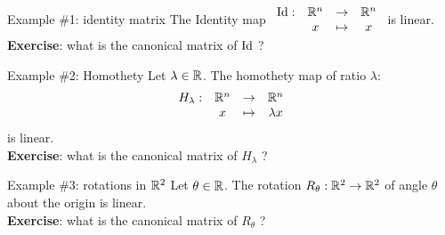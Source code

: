 \documentclass{beamer}
\begin{document}
\begin{frame}[t]{Example \#1: identity matrix}
		The Identity map \quad $\displaystyle
			\begin{array}{cccc}
				{{\rm Id}}: & \mathbb{R}^n & \to & \mathbb{R}^n \\
				   & x & \mapsto & x
			\end{array}
			$
			\quad is linear.
			\\
			\vspace{0.3cm}
			\textbf{Exercise}: what is the canonical matrix of ${{\rm Id}}$ ?
\end{frame}
\begin{frame}[t]{Example \#2: Homothety}
	Let $\lambda \in \mathbb{R}$.
		The homothety map of ratio $\lambda$: 
		 \vspace{-0.2cm}
		 $$
			\begin{array}{cccc}
				H_{\lambda}: & \R^n & \to & \R^n \\
				   & x & \mapsto & \lambda x
			\end{array}
			\vspace{-0.5cm}
			$$
			is linear.
			\\
			\vspace{0.3cm}
			\textbf{Exercise}: what is the canonical matrix of $H_{\lambda}$ ?
\end{frame}
\begin{frame}[t]{Example \#3: rotations in $\mathbb{R}^2$}
	Let $\theta \in \mathbb{R}$.
	The rotation $R_{\theta}: \mathbb{R}^2 \to \mathbb{R}^2$ of angle $\theta$ about the origin is linear.
			\\
			\vspace{0.3cm}
			\textbf{Exercise}: what is the canonical matrix of $R_{\theta}$ ?
\end{frame}
\end{document}
